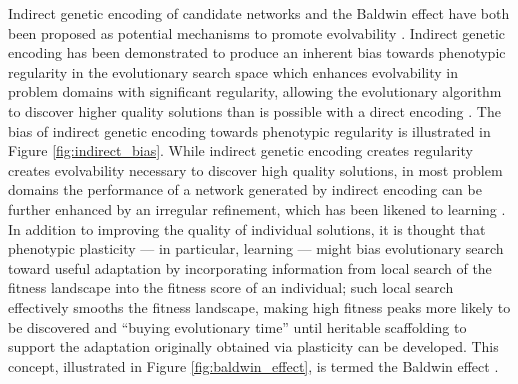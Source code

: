 Indirect genetic encoding of candidate networks and the Baldwin effect have both been proposed as potential mechanisms to promote evolvability \cite{Reisinger2007AcquiringRepresentations,Downing2010TheNetworks}. Indirect genetic encoding has been demonstrated to produce an inherent bias towards phenotypic regularity in the evolutionary search space \cite{Tonelli2013OnNetworks} which enhances evolvability in problem domains with significant regularity, allowing the evolutionary algorithm to discover higher quality solutions than is possible with a direct encoding  \cite{Clune2011OnRegularity}. The bias of indirect genetic encoding towards phenotypic regularity is illustrated in Figure \ref{fig:indirect_bias}. While indirect genetic encoding creates regularity creates evolvability necessary to discover high quality solutions, in most problem domains the performance of a network generated by indirect encoding can be further enhanced by an irregular refinement, which has been likened to learning \cite{Clune2011OnRegularity}. In addition to improving the quality of individual solutions, it is thought that phenotypic plasticity --- in particular, learning --- might bias evolutionary search toward useful adaptation by incorporating information from local search of the fitness landscape into the fitness score of an individual; such local search effectively smooths the fitness landscape, making high fitness peaks more likely to be discovered and ``buying evolutionary time'' until heritable scaffolding to support the adaptation originally obtained via plasticity can be developed. This concept, illustrated in Figure \ref{fig:baldwin_effect}, is termed the Baldwin effect \cite{Downing2010TheNetworks,Downing2009ComputationalEffect}.


